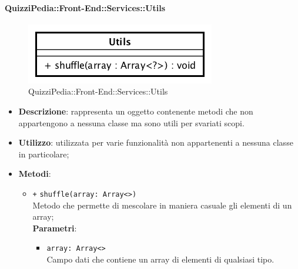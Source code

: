 \paragraph{QuizziPedia::Front-End::Services::Utils}

\label{QuizziPedia::Front-End::Services::Utils}
\begin{figure}[ht]
	\centering
	\includegraphics[scale=0.60]{UML/Classi/Front-End/QuizziPedia_Front-end_Services_Utils.png}
	\caption{QuizziPedia::Front-End::Services::Utils}
\end{figure}\FloatBarrier
\begin{itemize}
	\item \textbf{Descrizione}: rappresenta un oggetto contenente metodi che non appartengono a nessuna classe ma sono utili per svariati scopi.
	\item \textbf{Utilizzo}: utilizzata per varie funzionalità non appartenenti a nessuna classe in particolare;
	\item \textbf{Metodi}:
	\begin{itemize}
		\item \texttt{+} \texttt{shuffle(array: Array<>)} \\ Metodo che permette di mescolare in maniera casuale gli elementi di un array; \\
		\textbf{Parametri}:
		\begin{itemize}
			\item \texttt{array: Array<>} \\ Campo dati che contiene un array di elementi di qualsiasi tipo.
		\end{itemize}

	\end{itemize}
\end{itemize}
